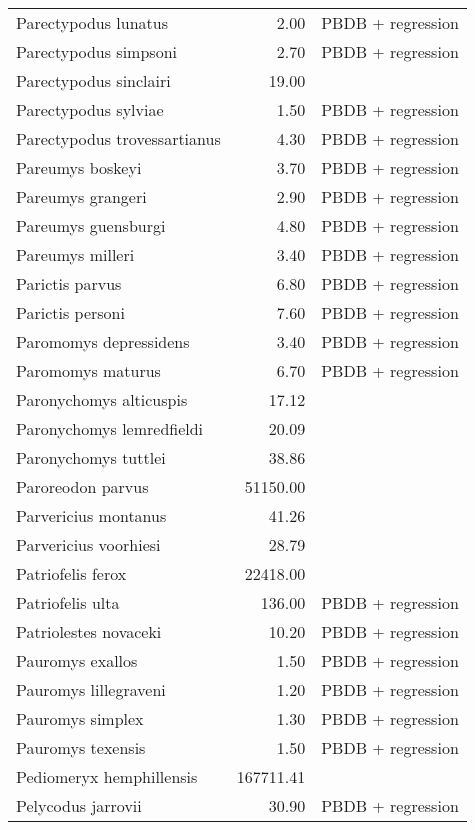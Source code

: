 \begin{table}[ht]
\begin{tabular}{lrl}
  Parectypodus lunatus & 2.00 & PBDB + regression \\ 
  Parectypodus simpsoni & 2.70 & PBDB + regression \\ 
  Parectypodus sinclairi & 19.00 & \cite{Wilson2012} \\ 
  Parectypodus sylviae & 1.50 & PBDB + regression \\ 
  Parectypodus trovessartianus & 4.30 & PBDB + regression \\ 
  Pareumys boskeyi & 3.70 & PBDB + regression \\ 
  Pareumys grangeri & 2.90 & PBDB + regression \\ 
  Pareumys guensburgi & 4.80 & PBDB + regression \\ 
  Pareumys milleri & 3.40 & PBDB + regression \\ 
  Parictis parvus & 6.80 & PBDB + regression \\ 
  Parictis personi & 7.60 & PBDB + regression \\ 
  Paromomys depressidens & 3.40 & PBDB + regression \\ 
  Paromomys maturus & 6.70 & PBDB + regression \\ 
  Paronychomys alticuspis & 17.12 & \cite{Tomiya2013} \\ 
  Paronychomys lemredfieldi & 20.09 & \cite{Tomiya2013} \\ 
  Paronychomys tuttlei & 38.86 & \cite{Tomiya2013} \\ 
  Paroreodon parvus & 51150.00 & \cite{McKenna2011} \\ 
  Parvericius montanus & 41.26 & \cite{Tomiya2013} \\ 
  Parvericius voorhiesi & 28.79 & \cite{Tomiya2013} \\ 
  Patriofelis ferox & 22418.00 & \cite{McKenna2011} \\ 
  Patriofelis ulta & 136.00 & PBDB + regression \\ 
  Patriolestes novaceki & 10.20 & PBDB + regression \\ 
  Pauromys exallos & 1.50 & PBDB + regression \\ 
  Pauromys lillegraveni & 1.20 & PBDB + regression \\ 
  Pauromys simplex & 1.30 & PBDB + regression \\ 
  Pauromys texensis & 1.50 & PBDB + regression \\ 
  Pediomeryx hemphillensis & 167711.41 & \cite{Tomiya2013} \\ 
  Pelycodus jarrovii & 30.90 & PBDB + regression \\ 

\end{tabular}
\end{table}

